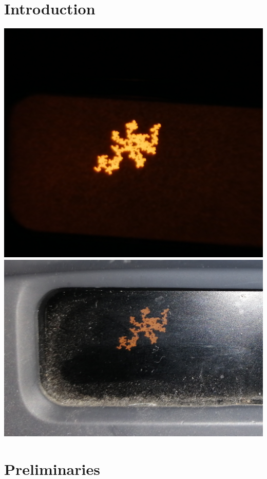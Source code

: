 \documentclass[12pt,a4paper]{scrartcl}
\numberwithin{equation}{subsection}
\newcommand{\1}{\mathbbm{1}}
\numberwithin{equation}{section}
\theoremstyle{definition}
\begin{document}
\section{Introduction}
\includegraphics[scale=0.04]{display.jpg} 
\includegraphics[scale=0.091]{display2.jpg}





\newpage


\section{Preliminaries} \label{prelim}
\end{document}
